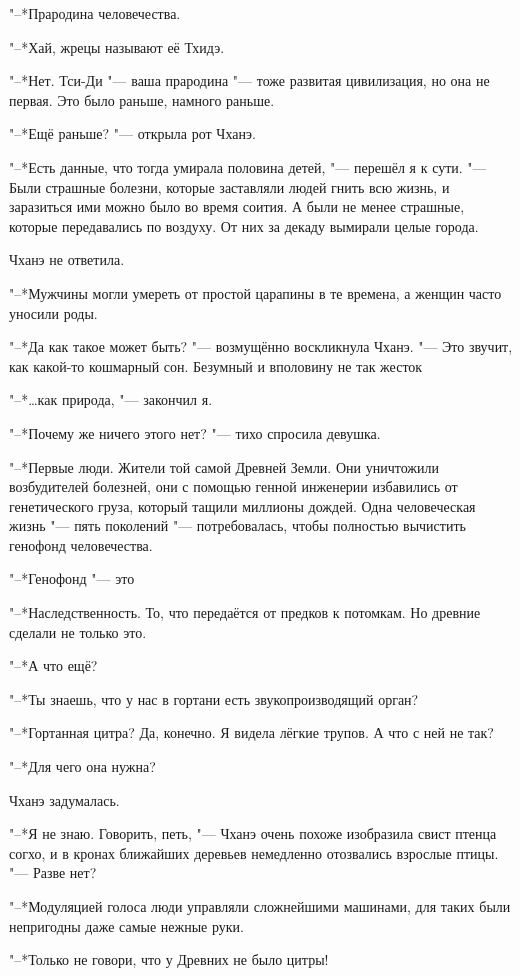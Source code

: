 "--*Прародина человечества.

"--*Хай, жрецы называют её Тхидэ.

"--*Нет.
Тси-Ди "--- ваша прародина "--- тоже развитая цивилизация, но она не первая.
Это было раньше, намного раньше.

"--*Ещё раньше? "--- открыла рот Чханэ.

"--*Есть данные, что тогда умирала половина детей, "--- перешёл я к сути.
"--- Были страшные болезни, которые заставляли людей гнить всю жизнь, и заразиться ими можно было во время соития.
А были не менее страшные, которые передавались по воздуху.
От них за декаду вымирали целые города.

Чханэ не ответила.

"--*Мужчины могли умереть от простой царапины в те времена, а женщин часто уносили роды.

"--*Да как такое может быть? "--- возмущённо воскликнула Чханэ.
"--- Это звучит, как какой-то кошмарный сон.
Безумный и вполовину не так жесток\ldotst

"--*\ldots как природа, "--- закончил я.

"--*Почему же ничего этого нет? "--- тихо спросила девушка.

"--*Первые люди.
Жители той самой Древней Земли.
Они уничтожили возбудителей болезней, они с помощью генной инженерии избавились от генетического груза, который тащили миллионы дождей.
Одна человеческая жизнь "--- пять поколений "--- потребовалась, чтобы полностью вычистить генофонд человечества.

"--*Генофонд "--- это\ldotst

"--*Наследственность.
То, что передаётся от предков к потомкам.
Но древние сделали не только это.

"--*А что ещё?

"--*Ты знаешь, что у нас в гортани есть звукопроизводящий орган?

"--*Гортанная цитра?
Да, конечно.
Я видела лёгкие трупов.
А что с ней не так?

"--*Для чего она нужна?

Чханэ задумалась.

"--*Я не знаю.
Говорить, петь, "--- Чханэ очень похоже изобразила свист птенца согхо, и в кронах ближайших деревьев немедленно отозвались взрослые птицы.
"--- Разве нет?

"--*Модуляцией голоса люди управляли сложнейшими машинами, для таких были непригодны даже самые нежные руки.

"--*Только не говори, что у Древних не было цитры!

